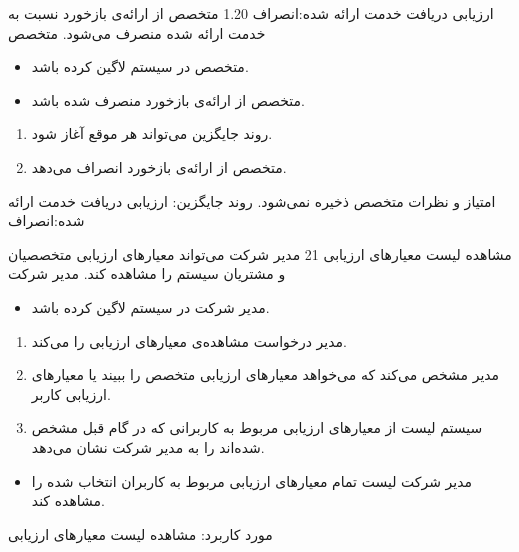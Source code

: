 {\alternativeflow
{
	ارزیابی دریافت خدمت ارائه شده:انصراف
}
{1.20}
{
	متخصص از ارائه‌ی بازخورد نسبت به خدمت ارائه شده منصرف می‌شود.
}
{
	متخصص
}
{}
{
	\begin{itemize}
		\vspace*{-0.6cm}
		\item 
		متخصص در سیستم لاگین کرده باشد.
		\item
		متخصص از ارائه‌ی بازخورد منصرف شده باشد.
	\end{itemize}
}
{
	\vspace*{-0.6cm}
	\begin{enumerate}
		\item 
		روند جایگزین می‌تواند هر موقع آغاز شود.
		\item
		متخصص از ارائه‌ی بازخورد انصراف می‌دهد.
	\end{enumerate}
}
{
	امتیاز و نظرات متخصص ذخیره نمی‌شود.
}
{
	روند جایگزین: ارزیابی دریافت خدمت ارائه شده:انصراف
}
}



{
\usecase
{
مشاهده لیست معیارهای ارزیابی
}
{
	21
}
{
مدیر شرکت می‌تواند معیارهای ارزیابی متخصصیان و مشتریان سیستم را مشاهده کند.
}
{
مدیر شرکت
}
{
}
{
	\begin{itemize}
	\vspace*{-0.6cm}
	\item 
	مدیر شرکت در سیستم لاگین کرده باشد.
\end{itemize}
}
{
	\vspace*{-0.6cm}
	\begin{enumerate}
		\item 
		مدیر درخواست مشاهده‌ی معیارهای ارزیابی را می‌کند.
		\item
	مدیر مشخص می‌کند که می‌خواهد معیارهای ارزیابی متخصص را ببیند یا معیارهای ارزیابی کاربر.
	\item 
	سیستم لیست از معیارهای ارزیابی مربوط به کاربرانی که در گام قبل مشخص شده‌اند را به مدیر شرکت نشان می‌دهد.
	\end{enumerate}
}
{
	\begin{itemize}
	\vspace*{-0.6cm}
	\item 
مدیر شرکت لیست تمام معیارهای ارزیابی مربوط به کاربران انتخاب شده را مشاهده کند.
\end{itemize}
}
{
}
{
	مورد کاربرد: مشاهده لیست معیارهای ارزیابی
}
}


